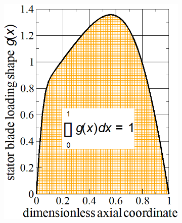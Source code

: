 \begin{figure}[h]
  \centering
  \begin{subfigure}{0.4\textwidth}
    \includegraphics[width=\textwidth]{figures/stator-blade-loading-shape.png}
  \end{subfigure}
  \begin{subfigure}{0.41\textwidth}
    \hspace{2pt}

\end{subfigure}
\end{figure}
